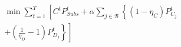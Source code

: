 \documentclass[../../outputs/main.tex]{subfiles}
\begin{document}
\begin{equation}
    \begin{split}
        \min \sum_{t = 1}^{T} \left[ C^t P^t_{Subs} + \alpha \sum_{j \in \mathcal{B}} \left\{ (1-\eta_C)P^t_{C_j} \right. \right. \\
        \left. \left. + \left( \frac{1}{\eta_D} - 1 \right) P^t_{D_j} \right\} \right]
    \end{split}
    \label{eq:genCost_withSCD}
\end{equation}
\end{document}
